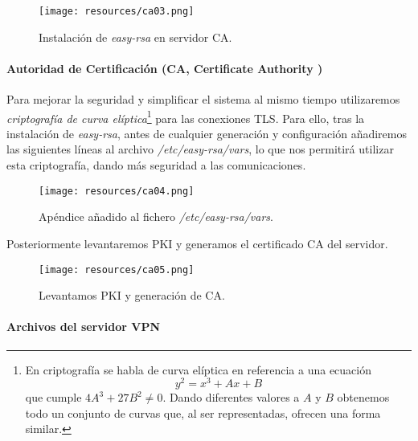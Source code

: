 \documentclass[a4paper, 11pt, titlepage]{article}
\begin{document}
            \begin{figure}[htp]
                \centering
                \texttt{[image: resources/ca03.png]}
                \caption{Instalación de \textit{easy-rsa} en servidor CA.}
                \label{ca03}
            \end{figure}
        
            \paragraph{Autoridad de Certificación (CA, Certificate Authority )}
        
            Para mejorar la seguridad y simplificar el sistema al mismo tiempo utilizaremos \textit{criptografía de curva elíptica}\footnote{
        
                En criptografía se habla de curva elíptica en referencia a una ecuación
                \[
                y^2=x^3+Ax+B
                \]
                que cumple $4A^3+27B^2\neq0$. Dando diferentes valores a $A$ y $B$
                obtenemos todo un conjunto de curvas que, al ser representadas, ofrecen 
                una forma similar. 
        
            } para las conexiones TLS. Para ello, tras la instalación
            de \textit{easy-rsa}, antes de cualquier generación y configuración añadiremos las siguientes líneas al archivo \textit{/etc/easy-rsa/vars}, lo que nos permitirá utilizar
            esta criptografía, dando más seguridad a las comunicaciones.
        
            \begin{figure}[htp]
                \centering
                \texttt{[image: resources/ca04.png]}
                \caption{Apéndice añadido al fichero \textit{/etc/easy-rsa/vars}.}
                \label{ca04}
            \end{figure}
        
            Posteriormente levantaremos PKI y generamos el certificado CA del servidor.
        
            \begin{figure}[htp]
                \centering
                \texttt{[image: resources/ca05.png]}
                \caption{Levantamos PKI y generación de CA.}
                \label{ca05}
            \end{figure}
        
            \paragraph{Archivos del servidor VPN}
        
\end{document}
